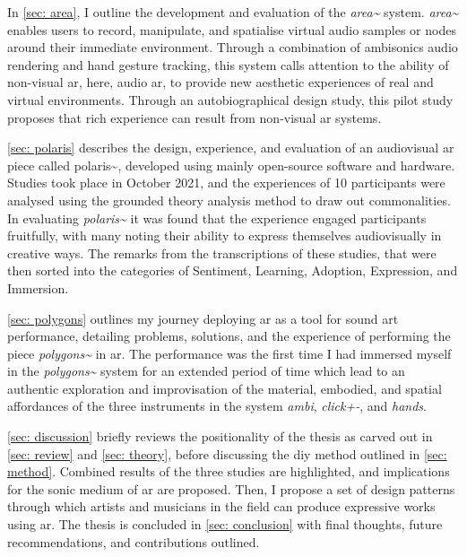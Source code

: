 In \autoref{sec: area}, I outline the development and evaluation of the \textit{area\textasciitilde{}} system. \textit{area\textasciitilde{}} enables users to record, manipulate, and spatialise virtual audio samples or nodes around their immediate environment. Through a combination of ambisonics audio rendering and hand gesture tracking, this system calls attention to the ability of non-visual \gls{ar}, here, audio \gls{ar}, to provide new aesthetic experiences of real and virtual environments. Through an autobiographical design study, this pilot study proposes that rich experience can result from non-visual \gls{ar} systems. 

\autoref{sec: polaris} describes the design, experience, and evaluation of an audiovisual \gls{ar} piece called {polaris\textasciitilde{}}, developed using mainly open-source software and hardware. Studies took place in October 2021, and the experiences of 10 participants were analysed using the grounded theory analysis method to draw out commonalities. In evaluating \textit{polaris\textasciitilde{}} it was found that the experience engaged participants fruitfully, with many noting their ability to express themselves audiovisually in creative ways. The remarks from the transcriptions of these studies, that were then sorted into the categories of Sentiment, Learning, Adoption, Expression, and Immersion. 

\autoref{sec: polygons} outlines my journey deploying \gls{ar} as a tool for sound \gls{art} performance, detailing problems, solutions, and the experience of performing the piece \textit{polygons\textasciitilde{}} in \gls{ar}. The performance was the first time I had immersed myself in the \textit{polygons\textasciitilde{}} system for an extended period of time which lead to an authentic exploration and improvisation of the material, embodied, and spatial affordances of the three instruments in the system \textit{ambi}, \textit{click+-}, and \textit{hands}.

\autoref{sec: discussion} briefly reviews the positionality of the thesis as carved out in \autoref{sec: review} and \autoref{sec: theory}, before discussing the \gls{diy} method outlined in \autoref{sec: method}. Combined results of the three studies are highlighted, and implications for the sonic medium of \gls{ar} are proposed. Then, I propose a set of design patterns through which artists and musicians in the field can produce expressive works using \gls{ar}. The thesis is concluded in \autoref{sec: conclusion} with final thoughts, future recommendations, and contributions outlined.
